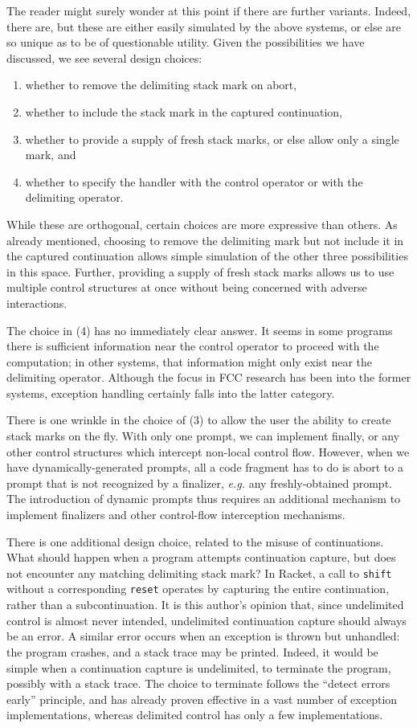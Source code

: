\documentclass[11pt]{article}
\begin{document}
The reader might surely wonder at this point if there are further variants.
Indeed, there are, but these are either easily simulated by the above systems, or else are so unique as to be of questionable utility.
Given the possibilities we have discussed, we see several design choices:
\begin{enumerate}
\item whether to remove the delimiting stack mark on abort,
\item whether to include the stack mark in the captured continuation,
\item whether to provide a supply of fresh stack marks, or else allow only a single mark, and
\item whether to specify the handler with the control operator or with the delimiting operator.
\end{enumerate}
While these are orthogonal, certain choices are more expressive than others.
As already mentioned, choosing to remove the delimiting mark but not include it in the captured continuation allows simple simulation of the other three possibilities in this space.
Further, providing a supply of fresh stack marks allows us to use multiple control structures at once without being concerned with adverse interactions.

The choice in (4) has no immediately clear answer.
It seems in some programs there is sufficient information near the control operator to proceed with the computation; in other systems, that information might only exist near the delimiting operator.
Although the focus in FCC research has been into the former systems, exception handling certainly falls into the latter category.

There is one wrinkle in the choice of (3) to allow the user the ability to create stack marks on the fly.
With only one prompt, we can implement finally, or any other control structures which intercept non-local control flow.
However, when we have dynamically-generated prompts, all a code fragment has to do is abort to a prompt that is not recognized by a finalizer, \textit{e.g.} any freshly-obtained prompt.
The introduction of dynamic prompts thus requires an additional mechanism to implement finalizers and other control-flow interception mechanisms.

There is one additional design choice, related to the misuse of continuations.
What should happen when a program attempts continuation capture, but does not encounter any matching delimiting stack mark?
In Racket, a call to \texttt{shift} without a corresponding \texttt{reset} operates by capturing the entire continuation, rather than a subcontinuation.
It is this author's opinion that, since undelimited control is almost never intended, undelimited continuation capture should always be an error.
A similar error occurs when an exception is thrown but unhandled: the program crashes, and a stack trace may be printed.
Indeed, it would be simple when a continuation capture is undelimited, to terminate the program, possibly with a stack trace.
The choice to terminate follows the ``detect errors early'' principle, and has already proven effective in a vast number of exception implementations, whereas delimited control has only a few implementations.
\end{document}
